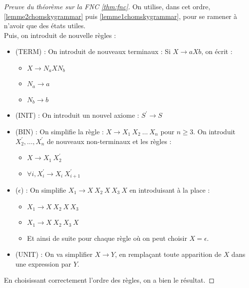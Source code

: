 \documentclass{cours}
\begin{document}
\begin{proof}[Preuve du théorème sur la FNC \ref{thm:fnc}]
    On utilise, dans cet ordre, \ref{lemme2chomskygrammar} puis \ref{lemme1chomskygrammar}, pour se ramener à n'avoir que des états utiles.\\
    Puis, on introduit de nouvelle règles : 
    \begin{itemize}
        \item (TERM) : On introduit de nouveaux terminaux : Si $X \rightarrow a X b$, on écrit : 
        \begin{itemize}
            \item $X \rightarrow N_{a} X N_{b}$
            \item $N_{a} \rightarrow a$
            \item $N_{b} \rightarrow b$
        \end{itemize}
        \item (INIT) : On introduit un nouvel axiome : $S^{'} \rightarrow S$
        \item (BIN) : On simplifie la règle : $X\rightarrow X_{1}\ X_{2} \ \ldots \ X_{n}$ pour $n \geq 3$.
        On introduit $X_{2}^{'}, \ldots, X_{n}^{'}$ de nouveaux non-terminaux et les règles : 
        \begin{itemize}
            \item $X\rightarrow X_{1} \ X_{2}^{'}$
            \item $\forall i, X_{i}^{'} \rightarrow X_{i} \ X_{i+1}^{'}$
        \end{itemize}
        \item ($\epsilon$) : On simplifie $X_{1} \rightarrow X\ X_{2} \ X \ X_{3} \ X $ en introduisant à la place : 
        \begin{itemize}
            \item $X_{1} \rightarrow X \ X_{2} \ X \ X_3$
            \item $X_{1} \rightarrow X \ X_{2} \ X_3 \ X$
            \item Et ainsi de suite pour chaque règle où on peut choisir $X = \epsilon$.
        \end{itemize}
        \item (UNIT) : On va simplifier $X \rightarrow Y$, en remplaçant toute apparition de $X$ dans une expression par $Y$. 
    \end{itemize}
    En choisissant correctement l'ordre des règles, on a bien le résultat. 
\end{proof}
\end{document}
